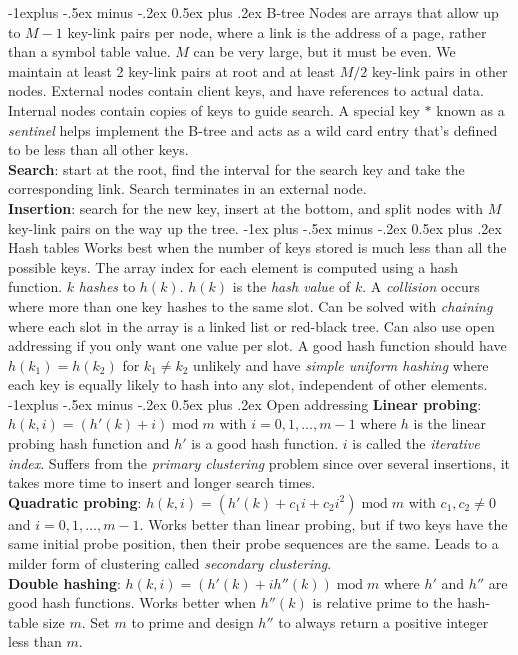 \documentclass[10pt,landscape]{article}
\makeatletter
\renewcommand{\section}{\@startsection{section}{1}{0mm}%
                                {-1ex plus -.5ex minus -.2ex}%
                                {0.5ex plus .2ex}%
                                {\normalfont\large\bfseries}}
\renewcommand{\subsection}{\@startsection{subsection}{2}{0mm}%
                                {-1explus -.5ex minus -.2ex}%
                                {0.5ex plus .2ex}%
                                {\normalfont\normalsize\bfseries}}
\makeatother
\begin{document}
\begin{multicols}{3}
\subsection{B-tree}
Nodes are arrays that allow up to $M-1$ key-link pairs per node, where a link is the address of a page, rather than a symbol table value. $M$ can be very large, but it must be even. We maintain at least 2 key-link pairs at root and at least $M/2$ key-link pairs in other nodes. External nodes contain client keys, and have references to actual data. Internal nodes contain copies of keys to guide search. A special key $*$ known as a \textit{sentinel} helps implement the B-tree and acts as a wild card entry that's defined to be less than all other keys. \\
\textbf{Search}: start at the root, find the interval for the search key and take the corresponding link. Search terminates in an external node.\\
\textbf{Insertion}: search for the new key, insert at the bottom, and split nodes with $M$ key-link pairs on the way up the tree.
\section{Hash tables}
Works best when the number of keys stored is much less than all the possible keys. The array index for each element is computed using a hash function. $k$ \textit{hashes} to $h(k)$. $h(k)$ is the \textit{hash value} of $k$. A \textit{collision} occurs where more than one key hashes to the same slot. Can be solved with \textit{chaining} where each slot in the array is a linked list or red-black tree. Can also use open addressing if you only want one value per slot. A good hash function should have $h(k_1)=h(k_2)$ for $k_1\neq k_2$ unlikely and have \textit{simple uniform hashing} where each key is equally likely to hash into any slot, independent of other elements.
\subsection{Open addressing}
\textbf{Linear probing}: $h(k,i)=(h'(k)+i)\operatorname{mod} m$ with $i=0,1,\dots,m-1$ where $h$ is the linear probing hash function and $h'$ is a good hash function. $i$ is called the \textit{iterative index}. Suffers from the \textit{primary clustering} problem since over several insertions, it takes more time to insert and longer search times.\\
\textbf{Quadratic probing}: $h(k,i)=(h'(k)+c_1i+c_2i^2)\operatorname{mod}m$ with $c_1,c_2\neq 0$ and $i=0,1,\dots,m-1$. Works better than linear probing, but if two keys have the same initial probe position, then their probe sequences are the same. Leads to a milder form of clustering called \textit{secondary clustering}.\\
\textbf{Double hashing}: $h(k,i)=(h'(k)+ih''(k))\operatorname{mod}m$ where $h'$ and $h''$ are good hash functions. Works better when $h''(k)$ is relative prime to the hash-table size $m$. Set $m$ to prime and design $h''$ to always return a positive integer less than $m$.  

\end{multicols}
\end{document}
